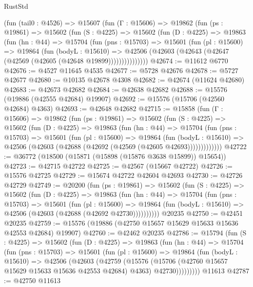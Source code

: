 \begin{lexlean}{RustStd}
\begin{coremodule}
    (fun (tail0 : @4526) =>
    @15607
      (fun (Γ : @15606) =>
      @19862
        (fun (ps : @19861) =>
        @15602
          (fun (S : @4225) =>
          @15602
            (fun (D : @4225) =>
            @19863
              (fun (hn : @44) =>
              @15704
                (fun (pns : @15703) =>
                @15601
                  (fun (pl : @15600) =>
                  @19864
                    (fun (bodyL : @15610) =>
                    @42506 (@42603 (@42643 (@42647 (@42569 (@42605 (@42648 @19899)))))))))))))))
@42674 := @11612 @6770
@42676 := @4527 @11645 @4535
@42677 := @5728 @42676
@42678 := @5727 @42677
@42680 := @10135 @42678 @4308
@42682 := @42674 (@11624 @42680)
@42683 := @42673 @42682
@42684 := @42638 @42682
@42688 := @15576 (@19886 (@42555 @42684) @19907)
@42692 := @15576 (@15706 (@42560 @42684) @4363)
@42693 := @42648 @42682
@42715 := @15858
    (fun (Γ : @15606) =>
    @19862
      (fun (ps : @19861) =>
      @15602
        (fun (S : @4225) =>
        @15602
          (fun (D : @4225) =>
          @19863
            (fun (hn : @44) =>
            @15704
              (fun (pns : @15703) =>
              @15601
                (fun (pl : @15600) =>
                @19864
                  (fun (bodyL : @15610) =>
                  @42506 (@42603 (@42688 (@42692 (@42569 (@42605 @42693)))))))))))))
@42722 := @36772 (@18500 (@15871 (@15898 (@15876 @3638 @15899)) @15654))
@42723 := @42715 @42722
@42725 := @42567 (@15667 @42722)
@42726 := @15576 @42725
@42729 := @15674 @42722 @42604 @42693
@42730 := @42726 @42729
@42749 := @20200
    (fun (ps : @19861) =>
    @15602
      (fun (S : @4225) =>
      @15602
        (fun (D : @4225) =>
        @19863
          (fun (hn : @44) =>
          @15704
            (fun (pns : @15703) =>
            @15601
              (fun (pl : @15600) =>
              @19864 (fun (bodyL : @15610) => @42506 (@42603 (@42688 (@42692 @42730))))))))))
    @20235
@42750 := @42451 @20235
@42759 := @15576 (@19886 (@42750 @15657 @15629 @15633 @15636 @42553 @42684) @19907)
@42760 := @42462 @20235
@42786 := @15794
    (fun (S : @4225) =>
    @15602
      (fun (D : @4225) =>
      @19863
        (fun (hn : @44) =>
        @15704
          (fun (pns : @15703) =>
          @15601
            (fun (pl : @15600) =>
            @19864
              (fun (bodyL : @15610) =>
              @42506
                (@42603
                  (@42759
                    (@15576
                      (@15706 (@42760 @15657 @15629 @15633 @15636 @42553 @42684) @4363)
                      @42730)))))))))
    @11613
@42787 := @42750 @11613

\end{coremodule}
\end{lexlean}
